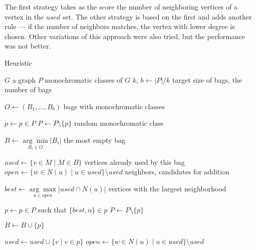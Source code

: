 The first strategy \Neighbors{} takes as the score the number of
neighboring vertices of a vertex in the $used$ set.
The other strategy \NeighborsDegree{} is based
on the first and adds another rule ---
if the number of neighbors matches, the vertex with lower degree is chosen.
%
Other variations of this approach were also tried,
but the performance was not better.



\begin{algorithm}
	\caption{Heuristic \Neighbors}%
	\label{alg:neighbors}
	\begin{algorithmic}[1]

		\Require{} $G$
		\Comment{} a graph
		\Require{} $P$
		\Comment{} monochromatic classes of $G$
		\Require{} $k$, $b \gets |P|/k$
		\Comment{} target size of bags, the number of bags

		\Ensure{} $O \gets (B_1, \ldots, B_b)$
		\Comment{} bags with monochromatic classes

		\State{} $p \gets p \in P$
		\State{} $P \gets P \setminus \{p\}$
		\Comment{} random monochromatic class

		\State{} $B \gets \underset{B_i \in O}{\arg\min} |B_i|$
		\Comment{} the most empty bag

		\State{} $used \gets \{{v \in M} \mid {M \in B } \}$
		\Comment{} vertices already used by this bag
		\State{} $open \gets  \{w \in N(u) \mid u \in used\} \setminus used $
		\Comment{} neighbors, candidates for addition


		\State{} $best \gets \underset{u \in open}{\arg\max}|used \cap N(u)|$
		\Comment{} vertices with the largest neighborhood

		\State{} $p \gets p \in P$ such that $\{best, n\} \in p$
		\State{} $P \gets P \setminus \{p\}$

		\State{} $B \gets B \cup \{p\}$

		\State{} $used \gets used \cup \{v \mid {v \in p} \}$
		\State{} $open \gets  \{w \in N(u) \mid u \in used\} \setminus used $
		\EndFor{}
		\EndWhile{}
		\EndWhile{}
	\end{algorithmic}
\end{algorithm}

\subsubsection*{\CyclesMatchChunks{}}

